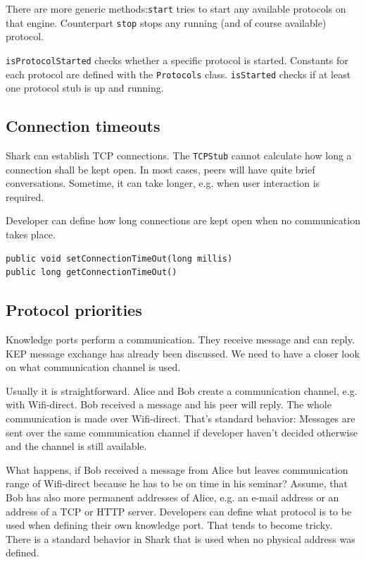 There are more generic methods:{\tt start} tries to start any available protocols on that engine. Counterpart {\tt stop} stops any running (and of course available) protocol. 

{\tt isProtocolStarted} checks whether a specific protocol is started. Constants for each protocol are defined with the {\tt Protocols} class. {\tt isStarted} checks if at least one protocol stub is up and running.

\subsection{Connection timeouts}
Shark can establish TCP connections. The {\tt TCPStub} cannot calculate how long a connection shall be kept open. In most cases, peers will have quite brief conversations. Sometime, it can take longer, e.g. when user interaction is required. 

Developer can define how long connections are kept open when no communication takes place. 

\begin{verbatim}
public void setConnectionTimeOut(long millis)
public long getConnectionTimeOut()
\end{verbatim}

\subsection{Protocol priorities}
\label{sec:se:protocolPriorities}
Knowledge ports perform a communication. They receive message and can reply. KEP message exchange has already been discussed. We need to have a closer look on what communication channel is used.

Usually it is straightforward. Alice and Bob create a communication channel, e.g. with Wifi-direct. Bob received a message and his peer will reply. The whole communication is made over Wifi-direct. That's standard behavior: Messages are sent over the same communication channel if developer haven't decided otherwise and the channel is still available.

What happens, if Bob received a message from Alice but leaves communication range of Wifi-direct because he has to be on time in his seminar? Assume, that Bob has also more permanent addresses of Alice, e.g. an e-mail address or an address of a TCP or HTTP server. Developers can define what protocol is to be used when defining their own knowledge port. That tends to become tricky. There is a standard behavior in Shark that is used when no physical address was defined.

